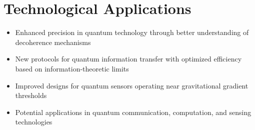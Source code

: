 \documentclass[11pt,letterpaper]{article}
\begin{document}
\section*{Technological Applications}

\begin{itemize}[leftmargin=*]
\item Enhanced precision in quantum technology through better understanding of decoherence mechanisms

\item New protocols for quantum information transfer with optimized efficiency based on information-theoretic limits

\item Improved designs for quantum sensors operating near gravitational gradient thresholds

\item Potential applications in quantum communication, computation, and sensing technologies
\end{itemize}
\end{document}
